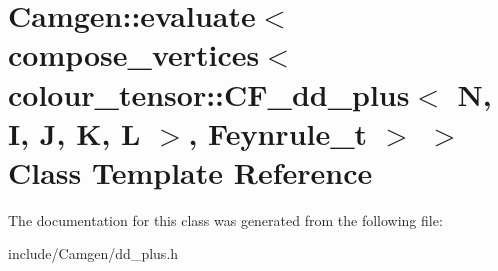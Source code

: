\hypertarget{a00155}{\section{Camgen\-:\-:evaluate$<$ compose\-\_\-vertices$<$ colour\-\_\-tensor\-:\-:C\-F\-\_\-dd\-\_\-plus$<$ N, I, J, K, L $>$, Feynrule\-\_\-t $>$ $>$ Class Template Reference}
\label{a00155}
}


The documentation for this class was generated from the following file\-:\begin{DoxyCompactItemize}
\item 
include/\-Camgen/dd\-\_\-plus.\-h\end{DoxyCompactItemize}
